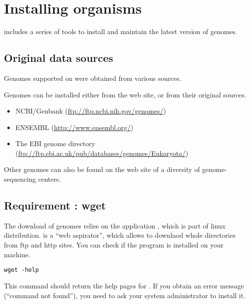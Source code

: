 
\section{Installing organisms}


\RSAT includes a series of tools to install and maintain the latest
version of genomes.

\subsection{Original data sources}

Genomes supported on \RSAT were obtained from various sources.

Genomes can be installed either from the \RSAT web site, or from their
original sources.  

\begin{itemize}
\item NCBI/Genbank (\url{ftp://ftp.ncbi.nih.gov/genomes/})

\item ENSEMBL (\url{http://www.ensembl.org/})

\item The EBI genome directory (\url{ftp://ftp.ebi.ac.uk/pub/databases/genomes/Eukaryota/})

\end{itemize}

Other genomes can also be found on the web site of a diversity of
genome-sequencing centers.

\subsection{Requirement : wget}

The download of genomes relies on the application ,
which is part of linux distribution.  is a ``web
aspirator'', which allows to downlaod whole directories from ftp and
http sites. You can check if the program is installed on your machine.

\begin{verbatim}
wget -help
\end{verbatim}

This command should return the help pages for .  If you
obtain an error message (``command not found''), you need to ask your
system administrator to install it.

